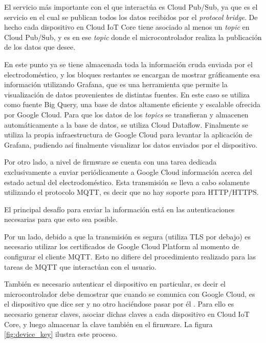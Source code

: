 El servicio más importante con el que interactúa es Cloud Pub/Sub, ya que es el servicio en el cual se publican todos los datos recibidos por el \emph{protocol bridge}. De hecho cada dispositivo en Cloud IoT Core tiene asociado al menos un \emph{topic} en Cloud Pub/Sub, y es en ese \emph{topic} donde el microcontrolador realiza la publicación de los datos que desee.

En este punto ya se tiene almacenada toda la información cruda enviada por el electrodoméstico, y los bloques restantes se encargan de mostrar gráficamente esa información utilizando Grafana, que es una herramienta que permite la visualización de datos provenientes de distintas fuentes. En este caso se utiliza como fuente Big Query, una base de datos altamente eficiente y escalable ofrecida por Google Cloud. Para que los datos de los \emph{topics} se transfieran y almacenen automáticamente a la base de datos, se utiliza Cloud Dataflow. Finalmente se utiliza la propia infraestructura de Google Cloud para levantar la aplicación de Grafana, pudiendo así finalmente visualizar los datos enviados por el dispositivo.

Por otro lado, a nivel de firmware se cuenta con una tarea dedicada exclusivamente a enviar periódicamente a Google Cloud información acerca del estado actual del electrodoméstico. Esta transmisión se lleva a cabo solamente utilizando el protocolo MQTT, es decir que no hay soporte para HTTP/HTTPS. 

El principal desafío para enviar la información está en las autenticaciones necesarias para que esto sea posible. 

Por un lado, debido a que la transmisión es segura (utiliza TLS por debajo) es necesario utilizar los certificados de Google Cloud Platform al momento de configurar el cliente MQTT. Esto no difiere del procedimiento realizado para las tareas de MQTT que interactúan con el usuario.

También es necesario autenticar el dispositivo en particular, es decir el microcontrolador debe demostrar que cuando se comunica con Google Cloud, es el dispositivo que dice ser y no otro haciéndose pasar por él \citep{device_security}. Para ello es necesario generar claves, asociar dichas claves a cada dispositivo en Cloud IoT Core, y luego almacenar la clave también en el firmware. La figura \ref{fig:device_key} ilustra este proceso.

